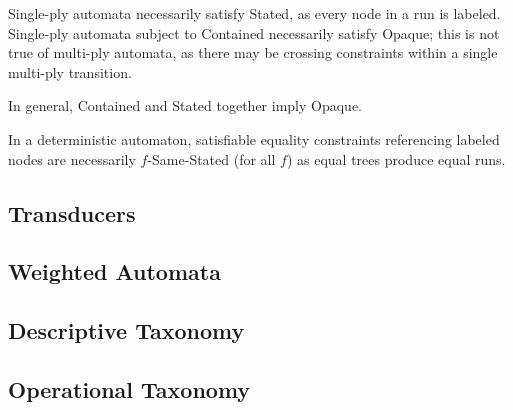 Single-ply automata necessarily satisfy Stated, as every node in a run is
labeled.  Single-ply automata subject to Contained necessarily satisfy
Opaque; this is not true of multi-ply automata, as there may be crossing
constraints within a single multi-ply transition.

In general, Contained and Stated together imply Opaque.

In a deterministic automaton, satisfiable equality constraints referencing
labeled nodes are necessarily $f$-Same-Stated (for all $f$) as equal trees
produce equal runs.

\subsection{Transducers}

\subsection{Weighted Automata}

\subsection{Descriptive Taxonomy}

\subsection{Operational Taxonomy}

